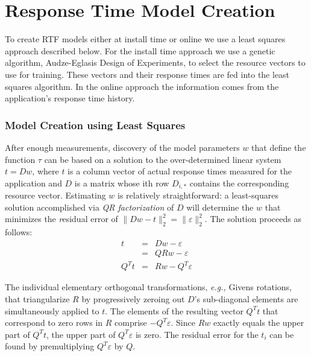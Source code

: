 \section{Response Time Model Creation}\label{model_creation}
To create RTF models either at install time or online we use a least squares approach described below.  For the install time approach we use a genetic algorithm, Audze-Eglasis Design of Experiments\cite{bates-aes03}, to select the resource vectors to use for training.  These vectors and their response times are fed into the least squares algorithm. In the online approach the information comes from the application's response time history.

\subsubsection*{Model Creation using Least Squares}
After enough measurements, discovery of the model parameters $w$ that define the function $\tau$
can be based on a solution to the over-determined linear system $t=Dw$,
where $t$ is a column vector of actual response times measured for the application
and $D$ is a matrix whose ith row $D_{i,*}$ contains the corresponding resource vector.
Estimating $w$ is relatively straightforward: a least-squares solution accomplished via
\emph{QR factorization}\cite{GoVL} of $D$ will determine the $w$ that minimizes the \emph residual error of
$\|Dw - t\|^2_2 =  \|\varepsilon\|^2_2$.
The solution proceeds as follows:
\begin{eqnarray*}
t     &=& Dw  - \varepsilon    \\
      &=& QRw - \varepsilon    \\
Q^Tt  &=& Rw  - Q^T\varepsilon
\end{eqnarray*}

The individual elementary orthogonal transformations, \emph{e.g.,} Givens rotations,
that triangularize $R$ by progressively zeroing out $D$'s sub-diagonal elements are simultaneously applied to $t$.
The elements of the resulting vector $Q^Tt$ that correspond to zero rows in $R$ comprise $-Q^T\varepsilon$.
Since $Rw$ exactly equals the upper part of $Q^Tt$, the upper part of $Q^T\varepsilon$ is zero. The residual error for the $t_i$
can be found by premultiplying $Q^T\varepsilon$ by $Q$.


